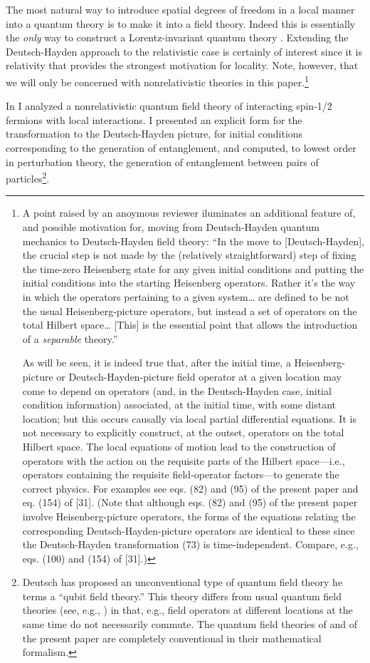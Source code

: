 \documentclass[12pt]{article}
\begin{document}
The most natural way to introduce spatial degrees of freedom in a local manner into a quantum theory is to
make it into a field theory. Indeed this is essentially the {\em only}\/ way to construct a Lorentz-invariant
quantum theory \cite{Weinberg95vol1}.  Extending the Deutsch-Hayden approach to the relativistic case is certainly of interest since it is relativity that provides the strongest motivation for locality. Note, however, that we will only be concerned with nonrelativistic theories in this paper.\footnote{A point raised by an anoymous reviewer iluminates an additional feature of, and possible motivation for,  moving from  Deutsch-Hayden quantum mechanics to  Deutsch-Hayden field theory: ``In the move to [Deutsch-Hayden], the crucial step is not made by the (relatively straightforward) step of fixing the time-zero Heisenberg state for any given initial conditions and putting the initial conditions into the starting Heisenberg operators. Rather it's the way in which the operators pertaining to a given system\ldots
are defined to be not the usual Heisenberg-picture operators, but instead a set of operators on the total Hilbert space\ldots 
[This] is the essential point that allows the introduction of a 
{\em separable}\/  theory.''  

As will be seen,  it is indeed true that, after the initial time, a Heisenberg-picture or Deutsch-Hayden-picture field operator at a given location may come to depend on operators (and, in the Deutsch-Hayden case, initial condition information)  associated,  at the initial time,  with some distant location; but this occurs causally via local partial differential equations. It  is not necessary to explicitly construct, at the outset,  operators on the total Hilbert space.  The local equations of motion lead to the construction of operators with the action on the requisite  parts of the  Hilbert space---i.e., operators  containing the requisite field-operator factors---to generate the correct physics. For  examples see %
 eqs. (82) and (95) of the present paper and eq. (154) of [31]. (Note that although eqs. (82) and (95) of the present  paper involve Heisenberg-picture operators, the forms of the equations relating the corresponding Deutsch-Hayden-picture operators are identical to these since the Deutsch-Hayden transformation (73) is time-independent. Compare, e.g., eqs. (100) and (154) of [31].)}

In \cite{Rubin02} I analyzed a nonrelativistic quantum field theory of interacting spin-1/2 fermions
with local interactions.   I presented an explicit form  for the transformation to the Deutsch-Hayden picture, for initial conditions
corresponding to the generation of entanglement, and computed, to lowest order in perturbation theory, the generation of entanglement between pairs of particles\footnote{Deutsch \cite{Deutsch04} has proposed an  unconventional type of quantum field theory he terms a ``qubit
field theory.'' This theory differs from usual quantum field theories (see, e.g., \cite{Brown92}) 
in that, e.g., field operators at different locations at the same time do not necessarily
commute. The quantum field theories of \cite{Rubin02} and of the present paper are completely conventional
in their mathematical formalism.}.
\end{document}
